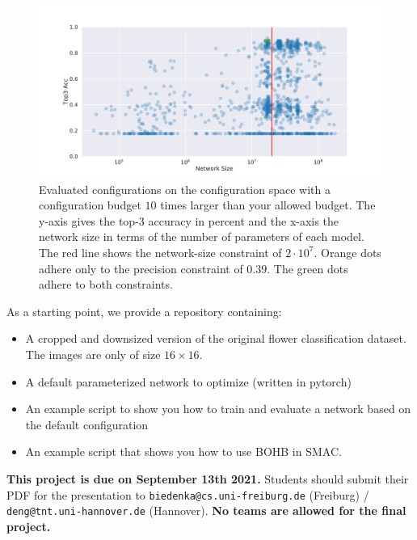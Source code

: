 \documentclass[10pt,a4paper]{article}
\newcommand{\duedate}{September 13th 2021}
\newcommand{\due}{{\bf This project is due on \duedate.} }
\begin{document}
\begin{itemize}
\begin{itemize}
\begin{itemize}
			  \end{itemize}
			  \begin{figure}[t]
			  	\centering
			  	\includegraphics[width=1\textwidth]{baselines.pdf}
			  	\caption{Evaluated configurations on the configuration space with a configuration budget $10$ times larger than your allowed budget. The y-axis gives the top-3 accuracy in percent and the x-axis the network size in terms of the number of parameters of each model. The red line shows the network-size constraint of $2\cdot10^7$. Orange dots adhere only to the precision constraint of $0.39$. The green dots adhere to both constraints.}\label{fig1}
			  \end{figure}
			\end{itemize}
		\end{itemize}
		
		As a starting point, we provide  a repository containing:
		\begin{itemize}
			\item A cropped and downsized version of the original flower classification dataset. The images are only of size $16\times16$.
			\item A default parameterized network to optimize (written in pytorch)
			\item An example script to show you how to train and evaluate a network based on the default configuration
			\item An example script that shows you how to use BOHB in SMAC.
		\end{itemize}
		
		
\noindent
\due Students should submit their PDF for the presentation to \texttt{biedenka@cs.uni-freiburg.de} (Freiburg) / \texttt{deng@tnt.uni-hannover.de} (Hannover). \textbf{No teams are allowed for the final project.}
\end{document}
